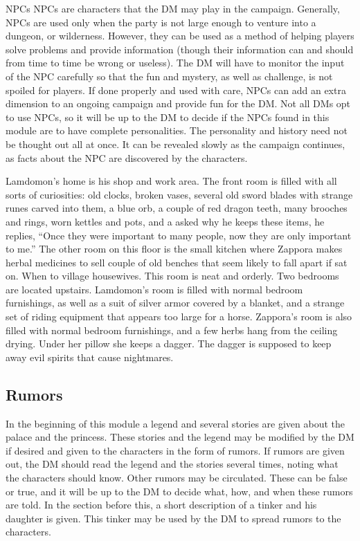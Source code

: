 \documentclass[palace_of_the_silver_princess]{subfiles}
\begin{document}
\begin{paperbox}{NPCs}
	NPCs are characters that the DM may play in the campaign. Generally,
	NPCs are used only when the party is not large enough to venture into a
	dungeon, or wilderness. However, they can be used as a method of helping
	players solve problems and provide information (though their information
	can and should from time to time be wrong or useless). The DM will have
	to monitor the input of the NPC carefully so that the fun and mystery,
	as well as challenge, is not spoiled for players. If done properly and
	used with care, NPCs can add an extra dimension to an ongoing campaign
	and provide fun for the DM. Not all DMs opt to use NPCs, so it will be
	up to the DM to decide if the NPCs found in this module are to have
	complete personalities. The personality and history need not be thought
	out all at once. It can be revealed slowly as the campaign continues, as
	facts about the NPC are discovered by the characters.
\end{paperbox}


Lamdomon’s home is his shop and work area. The front room is filled with
all sorts of curiosities: old clocks, broken vases, several old sword
blades with strange runes carved into them, a blue orb, a couple of red
dragon teeth, many brooches and rings, worn kettles and pots, and a
asked why he keeps these items, he replies, “Once they were important to
many people, now they are only important to me.” The other room on this
floor is the small kitchen where Zappora makes herbal medicines to sell
couple of old benches that seem likely to fall apart if sat on. When
to village housewives.  This room is neat and orderly. Two bedrooms are
located upstairs.  Lamdomon’s room is filled with normal bedroom
furnishings, as well as a suit of silver armor covered by a blanket, and
a strange set of riding equipment that appears too large for a horse.
Zappora’s room is also filled with normal bedroom furnishings, and a few
herbs hang from the ceiling drying. Under her pillow she keeps a dagger.
The dagger is supposed to keep away evil spirits that cause nightmares.

\subsection{Rumors}

In the beginning of this module a legend and several stories are given
about the palace and the princess. These stories and the legend may be
modified by the DM if desired and given to the characters in the form
of rumors. If rumors are given out, the DM should read the legend and
the stories several times, noting what the characters should know.
Other rumors may be circulated. These can be false or true, and it will
be up to the DM to decide what, how, and when these rumors are told. In
the section before this, a short description of a tinker and his
daughter is given. This tinker may be used by the DM to spread rumors to
the characters.
\end{document}

